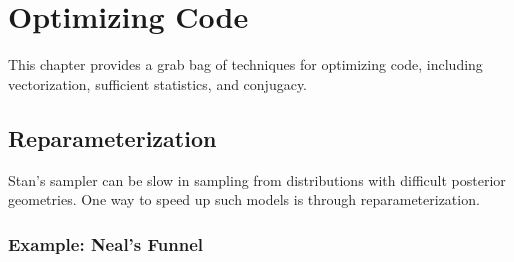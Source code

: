 \chapter{Optimizing \Stan Code}\label{optimization.chapter}
\noindent
This chapter provides a grab bag of techniques for optimizing \Stan
code, including vectorization, sufficient statistics, and conjugacy.

\section{Reparameterization}\label{reparameterization.section}

Stan's sampler can be slow in sampling from distributions with
difficult posterior geometries.  One way to speed up such models is
through reparameterization.  

\subsection{Example: Neal's Funnel}

